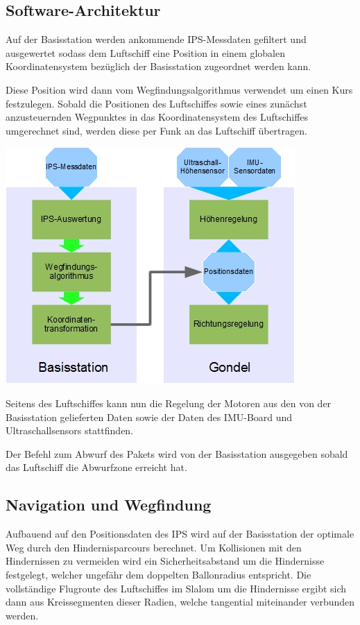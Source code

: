 \documentclass[lang=ngerman,inputenc=utf8,fontsize=10pt]{ldvarticle}
\begin{document}
\subsection*{Software-Architektur}
Auf der Basisstation werden ankommende IPS-Messdaten gefiltert und ausgewertet sodass dem Luftschiff eine Position in einem globalen Koordinatensystem bezüglich der Basisstation zugeordnet werden kann.

Diese Position wird dann vom Wegfindungsalgorithmus verwendet um einen Kurs festzulegen. Sobald die Positionen des Luftschiffes sowie eines zunächst anzusteuernden Wegpunktes in das Koordinatensystem des Luftschiffes umgerechnet sind, werden diese per Funk an das Luftschiff übertragen.


\includegraphics[scale=0.5]{Software}


Seitens des Luftschiffes kann nun die Regelung der Motoren aus den von der Basisstation gelieferten Daten sowie der Daten des IMU-Board und Ultraschallsensors stattfinden.

Der Befehl zum Abwurf des Pakets wird von der Basisstation ausgegeben sobald das Luftschiff die Abwurfzone erreicht hat.


\subsection*{Navigation und Wegfindung}
Aufbauend auf den Positionsdaten des IPS wird auf der Basisstation der optimale Weg durch den Hindernisparcours berechnet. Um Kollisionen mit den Hindernissen zu vermeiden wird ein Sicherheitsabstand um die Hindernisse festgelegt, welcher ungefähr dem doppelten Ballonradius entspricht. Die vollständige Flugroute des Luftschiffes im Slalom um die Hindernisse ergibt sich dann aus Kreissegmenten dieser Radien, welche tangential miteinander verbunden werden.
\end{document}
